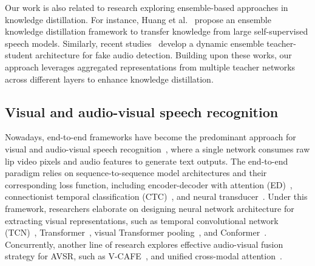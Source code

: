 
Our work is also related to research exploring ensemble-based approaches in knowledge distillation. 
For instance, Huang et al.~\cite{10096445} propose an ensemble knowledge distillation framework to transfer knowledge from large self-supervised speech models. 
Similarly, recent studies~\cite{10605999,10506099} develop a dynamic ensemble teacher-student architecture for fake audio detection. 
Building upon these works, our approach leverages aggregated representations from multiple teacher networks across different layers to enhance knowledge distillation.

 



\subsection{Visual and audio-visual speech recognition}

Nowadays, end-to-end frameworks have become the predominant approach for
visual and audio-visual speech recognition~\cite{afouras2018deep,ma2021end}, where a single network consumes raw lip video pixels and audio features to generate text outputs. The end-to-end paradigm relies on sequence-to-sequence model architectures and their corresponding loss function, including encoder-decoder with attention (ED)~\cite{afouras2018deep}, connectionist temporal classification (CTC)~\cite{petridis2018audio}, and neural transducer~\cite{makino2019recurrent}. 
Under this framework, researchers elaborate on designing neural network architecture for extracting visual representations, such as
 temporal convolutional network (TCN)~\cite{martinez2020lipreading}, Transformer~\cite{SerdyukBS22}, visual Transformer pooling~\cite{prajwal2022sub}, and Conformer~\cite{ma2021end}.
Concurrently, another line of research explores effective audio-visual fusion strategy for AVSR, such as V-CAFE~\cite{hong2022visual}, and unified cross-modal attention~\cite{li2024unified}. 

